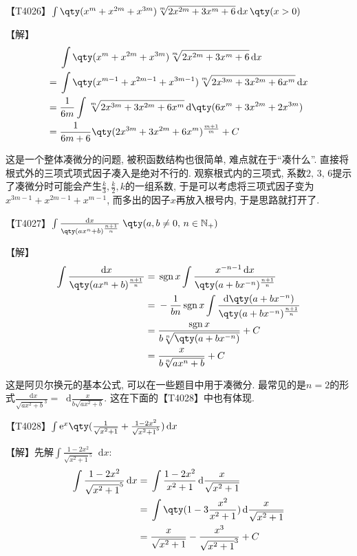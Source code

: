 \documentclass{ctexbook}
\DeclareMathOperator{\sgn}{sgn}
\newcommand{\e}{\mathrm{e}}
\newcommand*{\dif}{\mathop{}\!\mathrm{d}}
\begin{document}
{【T4026】$\int\qty(x^{m}+x^{2m}+x^{3m})\sqrt[m]{2x^{2m}+3x^{m}+6}\dif{x}\,\qty(x>0)$\par
【解】
\begin{align*}
{}&\int\qty(x^{m}+x^{2m}+x^{3m})\sqrt[m]{2x^{2m}+3x^{m}+6}\dif{x}\\
={}&\int\qty(x^{m-1}+x^{2m-1}+x^{3m-1})\sqrt[m]{2x^{3m}+3x^{2m}+6x^{m}}\dif{x}\\
={}&\frac{1}{6m}\int\sqrt[m]{2x^{3m}+3x^{2m}+6x^{m}}\dif{\qty(6x^{m}+3x^{2m}+2x^{3m})}\\
={}&\frac{1}{6m+6}\qty(2x^{3m}+3x^{2m}+6x^{m})^{\frac{m+1}{m}}+C
\end{align*}\par
{\kaishu 这是一个整体凑微分的问题, 被积函数结构也很简单, 难点就在于“凑什么”. 直接将根式外的三项式项式因子凑入是绝对不行的. 观察根式内的三项式, 系数$2,\,3,\,6$提示了凑微分时可能会产生$\frac{k}{3},\frac{k}{2},k$的一组系数, 于是可以考虑将三项式因子变为$x^{3m-1}+x^{2m-1}+x^{m-1}$, 而多出的因子$x$再放入根号内, 于是思路就打开了. \par}
【T4027】$\int\frac{\dif{x}}{\qty(ax^{n}+b)^{\frac{n+1}{n}}}\;\qty(a,b\ne0,\,n\in\mathbb{N_{+}})$\par
【解】
\begin{align*}
\int\frac{\dif{x}}{\qty(ax^{n}+b)^{\frac{n+1}{n}}}={}&\sgn{x}\int\frac{x^{-n-1}\dif{x}}{\qty(a+bx^{-n})^{\frac{n+1}{n}}}\\
={}&-\frac{1}{bn}\sgn{x}\int\frac{\dif{\qty(a+bx^{-n})}}{\qty(a+bx^{-n})^{\frac{n+1}{n}}}\\
={}&\frac{\sgn{x}}{b\sqrt[n]{\qty(a+bx^{-n})}}+C\\
={}&\frac{x}{b\sqrt[n]{ax^{n}+b}}+C
\end{align*}\par
{\kaishu 这是阿贝尔换元的基本公式, 可以在一些题目中用于凑微分. 最常见的是$n=2$的形式$\frac{\dif{x}}{\sqrt{ax^{2}+b}^{3}}=\dif{\frac{x}{b\sqrt{ax^{2}+b}}}$. 这在下面的【T4028】中也有体现. \par}	
【T4028】$\int\e^{x}\qty(\frac{1}{\sqrt{x^{2}+1}}+\frac{1-2x^{2}}{\sqrt{x^{2}+1}^{5}})\dif{x}$\par
【解】先解$\int\frac{1-2x^{2}}{\sqrt{x^{2}+1}^{5}}\dif{x}$: 
\begin{align*}
\int\frac{1-2x^{2}}{\sqrt{x^{2}+1}^{5}}\dif{x}={}&\int\frac{1-2x^{2}}{x^{2}+1}\dif{\frac{x}{\sqrt{x^{2}+1}}}\\
={}&\int\qty(1-3\frac{x^{2}}{x^{2}+1})\dif{\frac{x}{\sqrt{x^{2}+1}}}\\
={}&\frac{x}{\sqrt{x^{2}+1}}-\frac{x^{3}}{\sqrt{x^{2}+1}^{3}}+C\\

\end{align*}}
\end{document}
